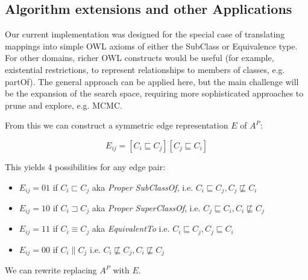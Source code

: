 \subsection{Algorithm extensions and other Applications}

Our current implementation was designed for the special case of
translating mappings into simple OWL axioms of either the SubClass or
Equivalence type. For other domains, richer OWL constructs would be
useful (for example, existential restrictions, to represent
relationships to members of classes, e.g. partOf). The general
approach can be applied here, but the main challenge will be the
expansion of the search space, requiring more sophisticated approaches
to prune and explore, e.g. MCMC.





From this we can construct a symmetric edge representation $E$ of $A^P$:

\begin{equation}
E_{ij} = [ C_i \sqsubseteq C_j] [ C_j \sqsubseteq C_i ]
\end{equation}

This yields 4 possibilities for any edge pair:

\begin{itemize}
\item[] $E_{ij} = 01$ if $C_i \sqsubset C_j$ aka \emph{Proper SubClassOf}, i.e. $C_i \sqsubseteq C_j, C_j \not\sqsubseteq C_i$
\item[] $E_{ij} = 10$ if $C_i \sqsupset C_j$ aka \emph{Proper SuperClassOf}, i.e.  $C_j \sqsubseteq C_i, C_i \not\sqsubseteq C_j$
\item[] $E_{ij} = 11$ if $C_i \equiv C_j$ aka \emph{EquivalentTo} i.e. $C_i \sqsubseteq C_j, C_j \sqsubseteq C_i$
\item[] $E_{ij} = 00$ if $C_i \parallel C_j$ i.e. $C_i \not\sqsubseteq C_j, C_i \not\sqsubseteq C_j$
\end{itemize}

We can rewrite  replacing $A^P$ with $E$.
